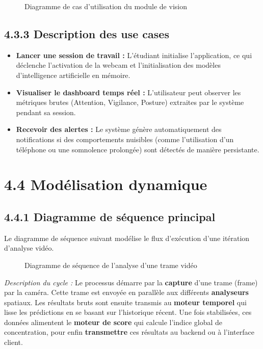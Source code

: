 \begin{figure}[H]
    \centering
    \caption{Diagramme de cas d'utilisation du module de vision}
    \label{fig:use_case_vision}
\end{figure}

\subsection{4.3.3 Description des use cases}
\begin{itemize}
    \item \textbf{Lancer une session de travail :} L'étudiant initialise l'application, ce qui déclenche l'activation de la webcam et l'initialisation des modèles d'intelligence artificielle en mémoire.
    \item \textbf{Visualiser le dashboard temps réel :} L'utilisateur peut observer les métriques brutes (Attention, Vigilance, Posture) extraites par le système pendant sa session.
    \item \textbf{Recevoir des alertes :} Le système génère automatiquement des notifications si des comportements nuisibles (comme l'utilisation d'un téléphone ou une somnolence prolongée) sont détectés de manière persistante.
\end{itemize}


\section{4.4 Modélisation dynamique}

\subsection{4.4.1 Diagramme de séquence principal}
Le diagramme de séquence suivant modélise le flux d'exécution d'une itération d'analyse vidéo.

\begin{figure}[H]
    \centering
    \caption{Diagramme de séquence de l'analyse d'une trame vidéo}
    \label{fig:seq_vision}
\end{figure}

\textit{Description du cycle :} 
Le processus démarre par la \textbf{capture} d'une trame (frame) par la caméra. Cette trame est envoyée en parallèle aux différents \textbf{analyseurs} spatiaux. Les résultats bruts sont ensuite transmis au \textbf{moteur temporel} qui lisse les prédictions en se basant sur l'historique récent. Une fois stabilisées, ces données alimentent le \textbf{moteur de score} qui calcule l'indice global de concentration, pour enfin \textbf{transmettre} ces résultats au backend ou à l'interface client.

